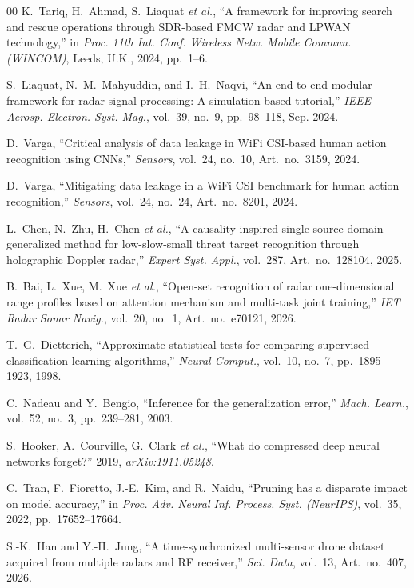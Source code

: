 \documentclass[conference]{IEEEtran}
\begin{document}
\begin{thebibliography}{00}
 K.~Tariq, H.~Ahmad, S.~Liaquat \emph{et al.}, ``A framework for improving search and rescue operations through SDR-based FMCW radar and LPWAN technology,'' in \emph{Proc. 11th Int. Conf. Wireless Netw. Mobile Commun. (WINCOM)}, Leeds, U.K., 2024, pp.~1--6.

 S.~Liaquat, N.~M.~Mahyuddin, and I.~H.~Naqvi, ``An end-to-end modular framework for radar signal processing: A simulation-based tutorial,'' \emph{IEEE Aerosp. Electron. Syst. Mag.}, vol.~39, no.~9, pp.~98--118, Sep. 2024.

 D.~Varga, ``Critical analysis of data leakage in WiFi CSI-based human action recognition using CNNs,'' \emph{Sensors}, vol.~24, no.~10, Art.~no.~3159, 2024.

 D.~Varga, ``Mitigating data leakage in a WiFi CSI benchmark for human action recognition,'' \emph{Sensors}, vol.~24, no.~24, Art.~no.~8201, 2024.

 L.~Chen, N.~Zhu, H.~Chen \emph{et al.}, ``A causality-inspired single-source domain generalized method for low-slow-small threat target recognition through holographic Doppler radar,'' \emph{Expert Syst. Appl.}, vol.~287, Art.~no.~128104, 2025.

 B.~Bai, L.~Xue, M.~Xue \emph{et al.}, ``Open-set recognition of radar one-dimensional range profiles based on attention mechanism and multi-task joint training,'' \emph{IET Radar Sonar Navig.}, vol.~20, no.~1, Art.~no.~e70121, 2026.

 T.~G.~Dietterich, ``Approximate statistical tests for comparing supervised classification learning algorithms,'' \emph{Neural Comput.}, vol.~10, no.~7, pp.~1895--1923, 1998.

 C.~Nadeau and Y.~Bengio, ``Inference for the generalization error,'' \emph{Mach. Learn.}, vol.~52, no.~3, pp.~239--281, 2003.

 S.~Hooker, A.~Courville, G.~Clark \emph{et al.}, ``What do compressed deep neural networks forget?'' 2019, \emph{arXiv:1911.05248}.

 C.~Tran, F.~Fioretto, J.-E.~Kim, and R.~Naidu, ``Pruning has a disparate impact on model accuracy,'' in \emph{Proc. Adv. Neural Inf. Process. Syst. (NeurIPS)}, vol.~35, 2022, pp.~17652--17664.

 S.-K.~Han and Y.-H.~Jung, ``A time-synchronized multi-sensor drone dataset acquired from multiple radars and RF receiver,'' \emph{Sci. Data}, vol.~13, Art.~no.~407, 2026.

\end{thebibliography}
\end{document}

